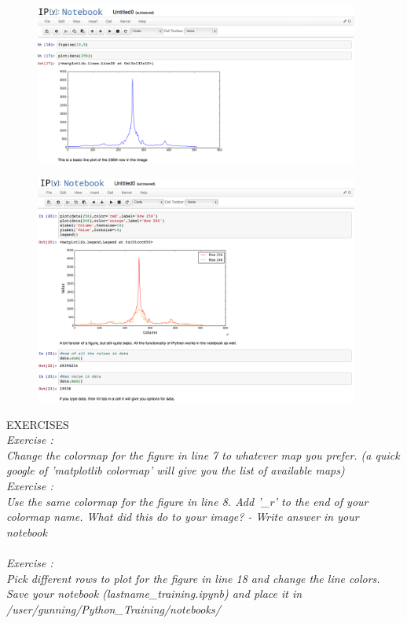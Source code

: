 \begin{figure}[H]
  \centering
    \includegraphics[width=0.95\textwidth]{notebook4.png}
\end{figure}

\begin{figure}[H]
  \centering
    \includegraphics[width=0.95\textwidth]{notebook5.png}
\end{figure}

\newpage
{\color{blue} {\sf\small EXERCISES}} \\

{\it Exercise  :  \\
Change the colormap for the figure in line 7 to whatever map you prefer. 
(a quick google of 'matplotlib colormap' will give you the list of available maps)}
\\

{\it Exercise  :  \\
Use the same colormap for the figure in line 8. Add '\_r' to the end of your colormap name.
What did this do to your image? - Write answer in your notebook}
\\
\\
{\it Exercise  :  \\
Pick  different rows to plot for the figure in line 18 and change the line colors.
\\
Save your notebook (lastname\_training.ipynb) and place it in /user/gunning/Python\_Training/notebooks/}

\let\cleardoublepage\clearpage



